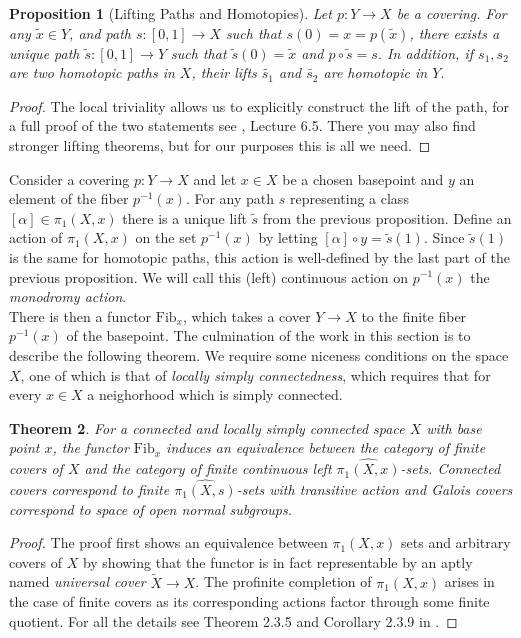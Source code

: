 \documentclass{article}
\newtheorem{theorem}{Theorem}[section]
\theoremstyle{definition}
\theoremstyle{remark}
\theoremstyle{plain}
\newtheorem{proposition}[theorem]{Proposition}
\begin{document}
\begin{proposition}[Lifting Paths and Homotopies]	
	Let $p: Y \to X$ be a covering. 
	For any $\widetilde{x} \in Y$, and path $s: [0,1] \to X$ such that $s(0) = x = p(\widetilde{x})$, there exists a unique path $\widetilde{s}:[0,1] \to Y$ such that $\widetilde{s}(0) = \widetilde{x}$ and $p \circ \widetilde{s} = s$.
	In addition, if $s_1, s_2$ are two homotopic paths in $X$, their lifts $\widetilde{s_1}$ and $\widetilde{s_2}$ are homotopic in $Y$.
\end{proposition}

\begin{proof}
	The local triviality allows us to explicitly construct the lift of the path, for a full proof of the two statements see \cite{FomenkoFuchs}, Lecture 6.5.
	There you may also find stronger lifting theorems, but for our purposes this is all we need.
\end{proof}
		
Consider a covering $p: Y \to X$ and let $x \in X$ be a chosen basepoint and $y$ an element of the fiber $p^{-1}(x)$.
	For any path $s$ representing a class $[\alpha] \in \pi_1(X,x)$ there is a unique lift $\widetilde{s}$ from the previous proposition.
	Define an action of $\pi_1(X,x)$ on the set $p^{-1}(x)$ by letting $[\alpha] \circ y = \widetilde{s}(1)$.
	Since $\widetilde{s}(1)$ is the same for homotopic paths, this action is well-defined by the last part of the previous proposition.
	We will call this (left) continuous action on $p^{-1}(x)$ the \textit{monodromy action}.\\
	\indent There is then a functor $\text{Fib}_x$, which takes a cover $Y \to X$ to the finite fiber $p^{-1}(x)$ of the basepoint.
The culmination of the work in this section is to describe the following theorem.
We require some niceness conditions on the space $X$, one of which is that of \textit{locally simply connectedness}, which requires that for every $x \in X$ a neighorhood which is simply connected.

	\begin{theorem}
	For a connected and locally simply connected space $X$ with base point $x$, the functor $\text{Fib}_x$ induces an equivalence between the category of finite covers of $X$ and the category of finite continuous left $\widehat{\pi_1(X,x)}$-sets.
	Connected covers correspond to finite $\widehat{\pi_1(X,s)}$-sets with transitive action and Galois covers correspond to space of open normal subgroups.
\end{theorem}
\begin{proof}
	The proof first shows an equivalence between $\pi_1(X,x)$ sets and arbitrary covers of $X$ by showing that the functor is in fact representable by an aptly named \textit{universal cover} $\widetilde{X} \to X$.
The profinite completion of $\pi_1(X,x)$ arises in the case of finite covers as its corresponding actions factor through some finite quotient.
	For all the details see Theorem 2.3.5 and Corollary 2.3.9 in \cite{Szamuely}.
\end{proof}
\end{document}
